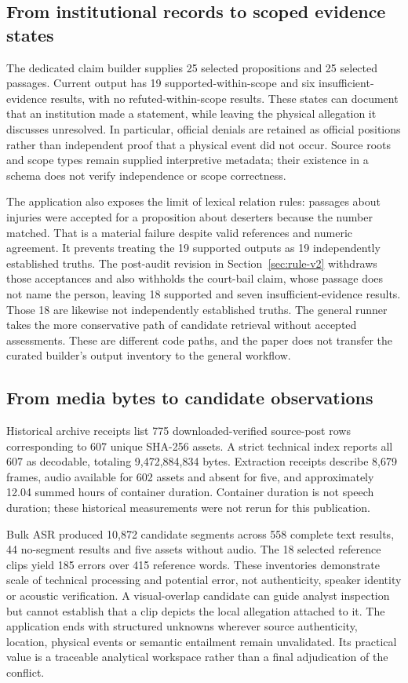 \subsection{From institutional records to scoped evidence states}
The dedicated claim builder supplies 25 selected propositions and 25 selected passages. Current output has 19 supported-within-scope and six insufficient-evidence results, with no refuted-within-scope results. These states can document that an institution made a statement, while leaving the physical allegation it discusses unresolved. In particular, official denials are retained as official positions rather than independent proof that a physical event did not occur. Source roots and scope types remain supplied interpretive metadata; their existence in a schema does not verify independence or scope correctness.

The application also exposes the limit of lexical relation rules: passages about injuries were accepted for a proposition about deserters because the number matched. That is a material failure despite valid references and numeric agreement. It prevents treating the 19 supported outputs as 19 independently established truths. The post-audit revision in Section~\ref{sec:rule-v2} withdraws those acceptances and also withholds the court-bail claim, whose passage does not name the person, leaving 18 supported and seven insufficient-evidence results. Those 18 are likewise not independently established truths. The general runner takes the more conservative path of candidate retrieval without accepted assessments. These are different code paths, and the paper does not transfer the curated builder's output inventory to the general workflow.

\subsection{From media bytes to candidate observations}
Historical archive receipts list 775 downloaded-verified source-post rows corresponding to 607 unique SHA-256 assets. A strict technical index reports all 607 as decodable, totaling 9,472,884,834 bytes. Extraction receipts describe 8,679 frames, audio available for 602 assets and absent for five, and approximately 12.04 summed hours of container duration. Container duration is not speech duration; these historical measurements were not rerun for this publication.

Bulk ASR produced 10,872 candidate segments across 558 complete text results, 44 no-segment results and five assets without audio. The 18 selected reference clips yield 185 errors over 415 reference words. These inventories demonstrate scale of technical processing and potential error, not authenticity, speaker identity or acoustic verification. A visual-overlap candidate can guide analyst inspection but cannot establish that a clip depicts the local allegation attached to it. The application ends with structured unknowns wherever source authenticity, location, physical events or semantic entailment remain unvalidated. Its practical value is a traceable analytical workspace rather than a final adjudication of the conflict.
